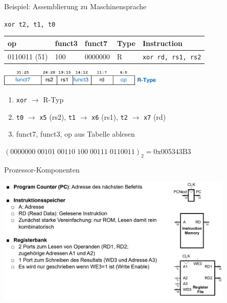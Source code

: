 \documentclass[
  german,            %
  aspectratio=169,    %
]{tumbeamer}
\begin{document}
\begin{frame}[c, fragile]{Beispiel: Assemblierung zu Maschinensprache}{}
	\begin{center}
		\large\texttt{xor t2, t1, t0}\\
		\scriptsize
		\begin{table}[]
			\begin{tabular}{|l|l|l|l|l|}
				\hline
				\rowcolor[HTML]{0078C3}
				{\color{white}\textbf{op}} & {\color{white}\textbf{funct3}} & {\color{white}\textbf{funct7}} & {\color{white}\textbf{Type}} & {\color{white}\textbf{Instruction}} \\ \hline
				0110011 (51)               & 100                            & 0000000                        & R                            & \texttt{xor rd, rs1, rs2}           \\ \hline
			\end{tabular}
		\end{table}

		\includegraphics[width=0.59\textwidth]{w08_r_type.pdf}
	\end{center}

	\begin{enumerate}
		\item \texttt{xor} $\rightarrow$ R-Typ
		\item \texttt{t0} $\rightarrow$ \texttt{x5} (rs2), \texttt{t1} $\rightarrow$ \texttt{x6} (rs1), \texttt{t2} $\rightarrow$ \texttt{x7} (rd)
		\item funct7, funct3, op aus Tabelle ablesen
	\end{enumerate}
	\begin{center}
		\Large
		$(0000000\;00101\;00110\;100\;00111\;0110011)_2 = \textrm{0x005343B3}$
	\end{center}

\end{frame}

\begin{frame}[c, fragile]{Prozessor-Komponenten}{}
	\begin{center}
		\includegraphics[width=0.85\textwidth]{w08_prozessorcomponents1_lv.png}
	\end{center}
\end{frame}
\end{document}
